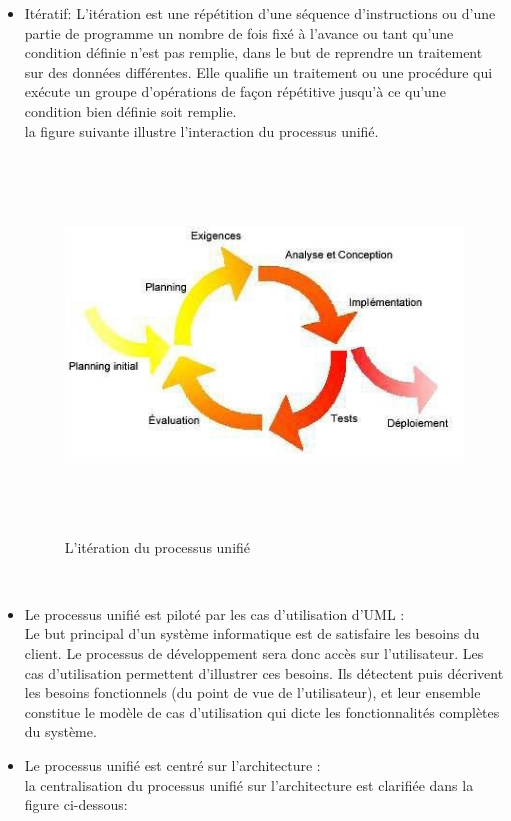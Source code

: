 \documentclass[12 pt ]{report}
\begin{document}
\begin{itemize}[font=\color{black} \Large, label=]
\item Itératif:
L'itération est une répétition d'une séquence d'instructions ou d'une partie de programme un nombre de fois fixé à l'avance ou tant qu'une condition définie n'est pas remplie, dans le but de reprendre un traitement sur des données différentes. Elle qualifie un traitement ou une procédure qui exécute un groupe d'opérations de façon répétitive jusqu'à ce qu'une condition bien définie soit remplie.
\\
la figure suivante illustre l'interaction du processus unifié.  
\begin{figure}[h]
\includegraphics[height=10cm]{pic1.jpg}
\caption{L'itération du  processus unifié }
\end{figure}
\\

\item Le processus unifié  est piloté par les cas d'utilisation d'UML :
 \\
Le but principal d'un système informatique est de satisfaire les besoins du client. Le processus de développement sera donc accès sur l'utilisateur. Les cas d'utilisation permettent d'illustrer ces besoins.
Ils détectent puis décrivent les besoins fonctionnels (du point de vue de l'utilisateur), et leur ensemble constitue le modèle de cas d'utilisation qui dicte les fonctionnalités complètes du système.
\newpage
\item 	Le processus unifié  est centré sur l’architecture : 
\\
 la centralisation du processus unifié sur l'architecture est clarifiée dans la figure ci-dessous:


\end{itemize}
\end{document}

